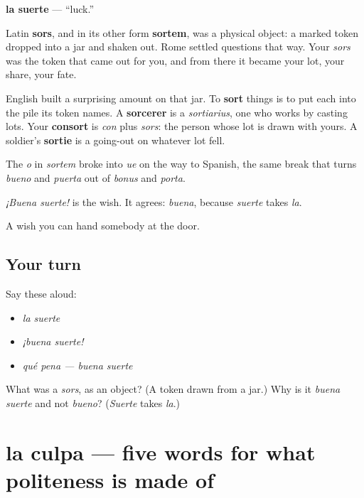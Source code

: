 \begin{cousinweb}
\textbf{la suerte} — \textquotedblleft{}luck.\textquotedblright{}

Latin \textbf{sors}, and in its other form \textbf{sortem}, was a physical object: a marked token dropped into a jar and shaken out. Rome settled questions that way. Your \emph{sors} was the token that came out for you, and from there it became your lot, your share, your fate.

English built a surprising amount on that jar. To \textbf{sort} things is to put each into the pile its token names. A \textbf{sorcerer} is a \emph{sortiarius}, one who works by casting lots. Your \textbf{consort} is \emph{con} plus \emph{sors}: the person whose lot is drawn with yours. A soldier's \textbf{sortie} is a going-out on whatever lot fell.

The \emph{o} in \emph{sortem} broke into \emph{ue} on the way to Spanish, the same break that turns \emph{bueno} and \emph{puerta} out of \emph{bonus} and \emph{porta}.

\emph{¡Buena suerte!} is the wish. It agrees: \emph{buena}, because \emph{suerte} takes \emph{la}.
\end{cousinweb}

\begin{grammarlens}[title={What you've built}]
A wish you can hand somebody at the door.
\end{grammarlens}

\subsection*{Your turn}
Say these aloud:

\begin{itemize}
\raggedright
  \item \emph{la suerte}
  \item \emph{¡buena suerte!}
  \item \emph{qué pena — buena suerte}
\end{itemize}

\begin{tcolorbox}[breakable,colback=teal!4,colframe=teal!35!black,title={Before you move on}]
What was a \emph{sors}, as an object? (A token drawn from a jar.) Why is it \emph{buena suerte} and not \emph{bueno}? (\emph{Suerte} takes \emph{la}.)
\end{tcolorbox}
\section[la culpa]{la culpa — five words for what politeness is made of}

